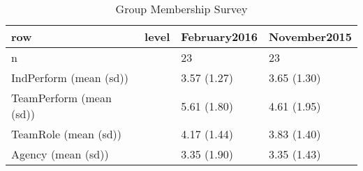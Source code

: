 \begin{table}[ht]
\centering
\begin{tabular}{llll}
  \hline
row & level & February2016 & November2015 \\ 
  \hline
n &  &   23 &   23 \\ 
  IndPerform (mean (sd)) &  & 3.57 (1.27) & 3.65 (1.30) \\ 
  TeamPerform (mean (sd)) &  & 5.61 (1.80) & 4.61 (1.95) \\ 
  TeamRole (mean (sd)) &  & 4.17 (1.44) & 3.83 (1.40) \\ 
  Agency (mean (sd)) &  & 3.35 (1.90) & 3.35 (1.43) \\ 
   \hline
\end{tabular}
\caption{Group Membership Survey} 
\label{tab:groupMemTable}
\end{table}
